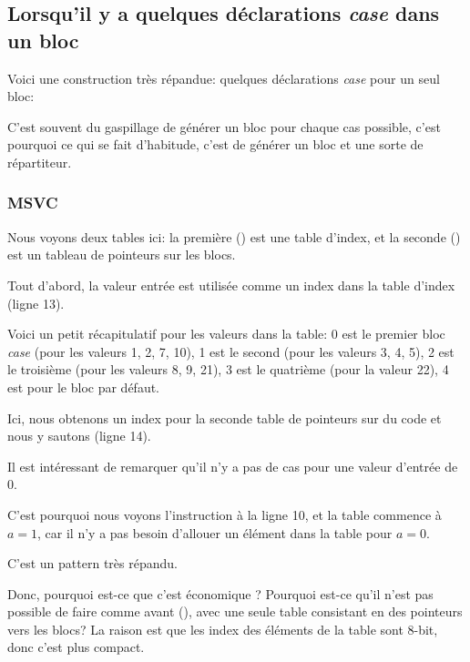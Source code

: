 \subsection{Lorsqu'il y a quelques déclarations \emph{case} dans un bloc}

Voici une construction très répandue: quelques déclarations \emph{case} pour un seul bloc:



C'est souvent du gaspillage de générer un bloc pour chaque cas possible, c'est
pourquoi ce qui se fait d'habitude, c'est de générer un bloc et une sorte de répartiteur.

\subsubsection{MSVC}



Nous voyons deux tables ici: la première () est une table d'index,
et la seconde () est un tableau de pointeurs sur les blocs.

Tout d'abord, la valeur entrée est utilisée comme un index dans la table d'index
(ligne 13).

Voici un petit récapitulatif pour les valeurs dans la table:
0 est le premier bloc \emph{case} (pour les valeurs 1, 2, 7, 10),
1 est le second (pour les valeurs 3, 4, 5),
2 est le troisième (pour les valeurs 8, 9, 21),
3 est le quatrième (pour la valeur 22),
4 est pour le bloc par défaut.

Ici, nous obtenons un index pour la seconde table de pointeurs sur du code et nous
y sautons (ligne 14).

Il est intéressant de remarquer qu'il n'y a pas de cas pour une valeur d'entrée
de 0.

C'est pourquoi nous voyons l'instruction \DEC à la ligne 10, et la table commence
à $a=1$, car il n'y a pas besoin d'allouer un élément dans la table pour $a=0$.

C'est un pattern très répandu.

Donc, pourquoi est-ce que c'est économique ?
Pourquoi est-ce qu'il n'est pas possible de faire comme avant (),
avec une seule table consistant en des pointeurs vers les blocs?
La raison est que les index des éléments de la table sont 8-bit, donc c'est plus
compact.

